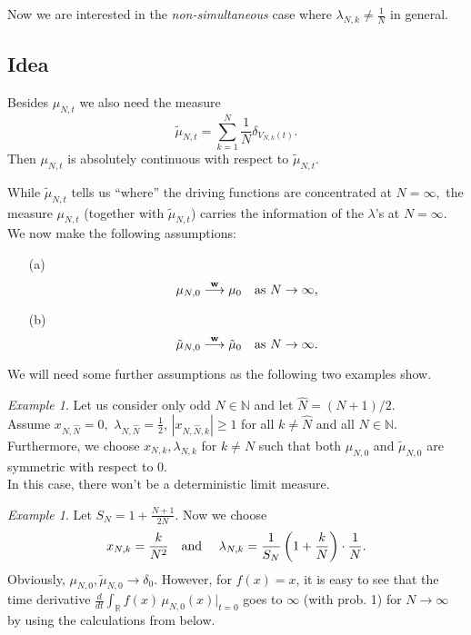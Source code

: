 \documentclass[a4paper,twoside,11pt]{article}
\theoremstyle{plain}
\theoremstyle{definition}
\theoremstyle{remark}
\newtheorem{example}[theorem]{Example}
\newcommand\R{\mathbb R}         %
\newcommand\N{\mathbb N}         %
\begin{document}
Now we are interested in the \emph{non-simultaneous} case where $\lambda_{N,k}\not=\frac1{N}$ in general.

\subsection{Idea}

Besides $\mu_{N,t}$ we also need the measure $$\tilde{\mu}_{N,t}=\sum_{k=1}^N \frac{1}{N} \delta_{V_{N,k}(t)}.$$
Then $\mu_{N,t}$ is absolutely continuous with respect to $\tilde{\mu}_{N,t}.$

While $\tilde{\mu}_{N,t}$ tells us ``where'' the driving functions are concentrated at $N=\infty,$ the measure $\mu_{N,t}$ (together with $\tilde{\mu}_{N,t}$) carries the information of the $\lambda$'s at $N=\infty.$\\
We now make the following assumptions:
\begin{itemize}
\item[(a)] \begin{equation}
\mu_{N,0} \overset{{\bold w}}{\longrightarrow} \mu_{0} \quad \text{as $N\to\infty$,}
\label{eq:1}
\end{equation}
\item[(b)] \begin{equation}
\tilde{\mu}_{N,0}\overset{{\bold w}}{\longrightarrow}\tilde{\mu}_{0} \quad \text{as $N\to\infty$.}
\label{eq:2}
\end{equation}
\end{itemize}

We will need some further assumptions as the following two examples show.

\begin{example} Let us consider only odd $N\in\N$ and let $\hat{N}=(N+1)/2.$\\ 
Assume $x_{N,\hat{N}}=0,$ $\lambda_{N,\hat{N}}=\frac1{2}$, $|x_{N,\hat{N},k}|\geq 1$ for all $k\neq \hat{N}$ and all $N\in\N.$ Furthermore, we choose $x_{N,k},\lambda_{N,k}$ for $k\neq N$ such that both $\mu_{N,0}$ and $\tilde{\mu}_{N,0}$ are symmetric with respect to $0$.\\
In this case, there won't be a deterministic limit measure. 
\end{example}


\begin{example}\label{too_vari}
Let $S_N=1+\frac{N+1}{2N}$. Now we choose
$$x_{N,k}=\frac{k}{N^2} \text{\quad and \quad} \lambda_{N,k} = \frac{1}{S_N}\left(1 + \frac{k}{N}\right) \cdot \frac{1}{N}.$$
Obviously, $\mu_{N,0}, \tilde{\mu}_{N,0} \to \delta_0.$ However, for $f(x)=x$, it is easy to see that the time derivative
$\frac{d}{dt}\int_\R f(x) \, \mu_{N,0}(x)|_{t=0}$ goes to $\infty$ (with prob. 1) for $N\to\infty$ by using the calculations from below. 
\end{example}
\end{document}
